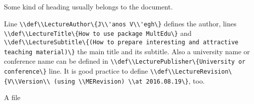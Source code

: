 {
Some kind of heading usually belongs to the document.

Line \lstinline|\\def\\LectureAuthor\{J\\'anos V\\'egh\}| defines the author,
lines \lstinline|\\def\\LectureTitle\{How to use package MultEdu\}|
and \lstinline|\\def\\LectureSubtitle\{(How to prepare interesting and attractive teaching material)\}| the main title and its subtitle.
Also a university name or conference name can be defined in \lstinline|\\def\\LecturePublisher\{University or conference\}| line.
It is good practice to define \lstinline|\\def\\LectureRevision\{V\\Version\\ (using \\MERevision) \\at 2016.08.19\}|, too.

}
{A  file}
